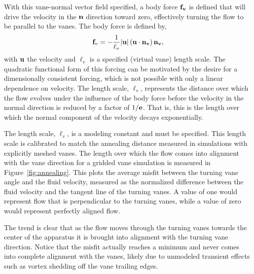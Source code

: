 With this vane-normal vector field specified, a body force ${\bf f_v}$
is defined that will drive the velocity in the ${\bf n}$ direction
toward zero, effectively turning the flow to be parallel to the
vanes. The body force is defined by,
\begin{equation}
 {\bf f}_v= -\frac{1}{\ell_v}|{\bf u}|\,({\bf u}\cdot{\bf n_v})\,{\bf n_v},
 \label{eqn:body_force}
\end{equation}
with ${\bf u}$ the velocity and $\ell_v$ is a specified (virtual vane)
length scale. The quadratic functional form of this forcing can be
motivated by the desire for a dimensionally consistent forcing, which is
not possible with only a linear dependence on velocity. The length
scale, $\ell_v$, represents the distance over which the 
flow evolves under the influence of the body force before the
velocity in the normal direction is reduced by a factor of $1/{\bf 
e}$. That is, this is the length over which the normal component of the
velocity decays exponentially. 

The length scale, $\ell_v$, is a modeling constant and must be
specified. This length scale is calibrated to match the annealing
distance measured in simulations with explicitly meshed vanes. The
length over which the flow comes into alignment with the vane direction
for a gridded vane simulation is measured in
Figure~\ref{fig:annealing}. This plots the average misfit between the
turning vane angle and the fluid velocity, measured as the normalized
difference between the fluid velocity and the tangent line of the
turning vanes. A value of one would represent flow that is perpendicular
to the turning vanes, while a value of zero would represent perfectly
aligned flow.   

The trend is clear that as the flow moves through the turning vanes
towards the center of the apparatus it is brought into alignment with
the turning vane direction. Notice that the misfit actually reaches a
minimum and never comes into complete alignment with the vanes, likely
due to unmodeled transient effects such as vortex shedding off the vane
trailing edges.  


